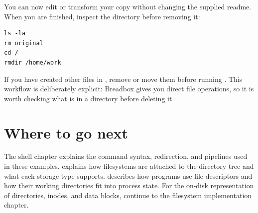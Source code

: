 You can now edit or transform your copy without changing the supplied readme. When you are finished, inspect the directory before removing it:

\begin{lstlisting}
ls -la
rm original
cd /
rmdir /home/work
\end{lstlisting}

If you have created other files in , remove or move them before running . This workflow is deliberately explicit: Breadbox gives you direct file operations, so it is worth checking what is in a directory before deleting it.

\section{Where to go next}

The shell chapter explains the command syntax, redirection, and pipelines used in these examples.  explains how filesystems are attached to the directory tree and what each storage type supports.  describes how programs use file descriptors and how their working directories fit into process state. For the on-disk representation of directories, inodes, and data blocks, continue to the filesystem implementation chapter.
